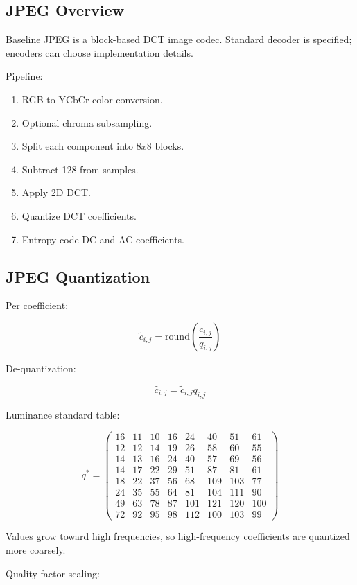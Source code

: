 \subsection{JPEG Overview}

Baseline JPEG is a block-based DCT image codec. Standard decoder is specified; encoders can choose implementation details.

Pipeline:

\begin{enumerate}
  \item RGB to YCbCr color conversion.
  \item Optional chroma subsampling.
  \item Split each component into $8x8$ blocks.
  \item Subtract 128 from samples.
  \item Apply 2D DCT.
  \item Quantize DCT coefficients.
  \item Entropy-code DC and AC coefficients.
\end{enumerate}

\subsection{JPEG Quantization}

Per coefficient:

\[
\tilde{c}_{i,j}
=
\mathrm{round}\left(\frac{c_{i,j}}{q_{i,j}}\right)
\]

De-quantization:

\[
\hat{c}_{i,j}=\tilde{c}_{i,j}q_{i,j}
\]

Luminance standard table:

\[
q^*=
\begin{pmatrix}
16&11&10&16&24&40&51&61\\
12&12&14&19&26&58&60&55\\
14&13&16&24&40&57&69&56\\
14&17&22&29&51&87&81&61\\
18&22&37&56&68&109&103&77\\
24&35&55&64&81&104&111&90\\
49&63&78&87&101&121&120&100\\
72&92&95&98&112&100&103&99
\end{pmatrix}
\]

Values grow toward high frequencies, so high-frequency coefficients are quantized more coarsely.

Quality factor scaling:

